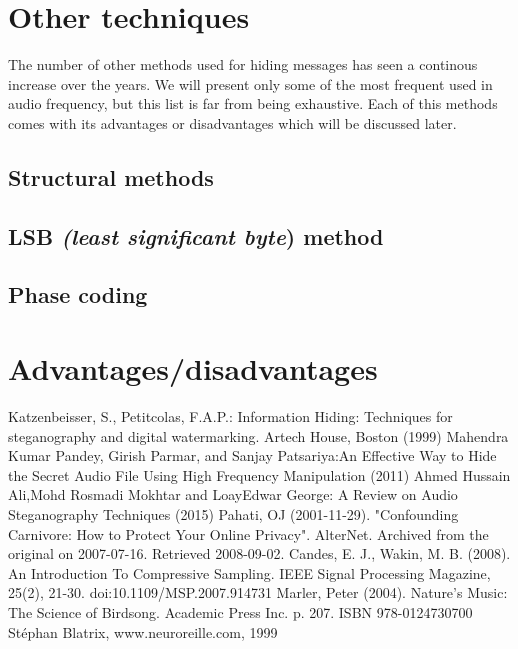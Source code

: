 \documentclass[12pt]{report}
\begin{document}
\section{Other techniques}
The number of other methods used for hiding messages has seen a continous increase over the years. We will present only some of the most frequent used in audio frequency, but this list is far from being exhaustive. Each of this methods comes with its advantages or disadvantages which will be discussed later.
\subsection{Structural methods}
\subsection{LSB \emph{(least significant byte}) method}
\subsection{Phase coding}
\section{Advantages/disadvantages}



\begin{thebibliography}{6}
Katzenbeisser, S., Petitcolas, F.A.P.: Information Hiding: Techniques for steganography 
and digital watermarking. Artech House, Boston (1999) 
Mahendra Kumar Pandey, Girish Parmar, and Sanjay Patsariya:An Effective Way to Hide the Secret Audio File Using 
High Frequency Manipulation (2011)
Ahmed Hussain Ali,Mohd Rosmadi Mokhtar and LoayEdwar George: A Review on Audio Steganography Techniques (2015)
Pahati, OJ (2001-11-29). "Confounding Carnivore: How to Protect Your Online Privacy". AlterNet. Archived from the original on 2007-07-16. Retrieved 2008-09-02.
Candes, E. J., Wakin, M. B. (2008). An Introduction To Compressive Sampling. IEEE Signal Processing Magazine, 25(2), 21-30. doi:10.1109/MSP.2007.914731
Marler, Peter (2004). Nature's Music: The Science of Birdsong. Academic Press Inc. p. 207. ISBN 978-0124730700
Stéphan Blatrix, www.neuroreille.com, 1999
\end{thebibliography}
\end{document}
